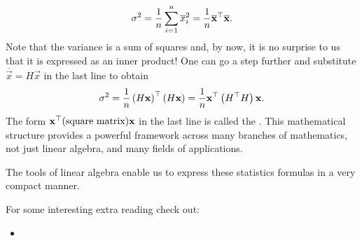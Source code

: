\documentclass{ximera}
\begin{document}
\begin{example}
\begin{enumerate}
    \begin{equation*}
      \sigma^2
      = \frac{1}{n} \sum_{i=1}^n \overline{x}_i^2
      = \frac{1}{n} \overline{\mathbf{x}}^\top \overline{\mathbf{x}}.
    \end{equation*}
    Note that the variance is a sum of squares and, by now, it is no
    surprise to us that it is expressed as an inner product!
    One can go a step further and substitute
    $\overline{\vec{x}} = H \vec{x}$ in the last line to obtain
    \[
      \sigma^2
      = \frac{1}{n} \left( H \mathbf{x} \right)^\top \left( H
        \mathbf{x} \right)
      = \frac{1}{n} \mathbf{x}^\top \left( H^\top H \right) \mathbf{x}.
    \]
    The form $\mathbf{x}^\top \text{(square matrix)} \mathbf{x}$ in
    the last line is called the \textit{}. This
    mathematical structure provides a powerful framework across many
    branches of mathematics, not just linear algebra, and many fields
    of applications.
  \end{enumerate}
  The tools of linear algebra enable us to express these statistics
  formulas in a very compact manner.
\end{example}




For some interesting extra reading check out:
\begin{itemize}
\item {}
\end{itemize}
\end{document}
